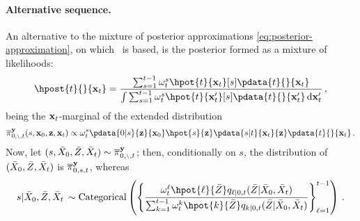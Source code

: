 \paragraph{Alternative sequence.} An alternative to the mixture of posterior approximations \eqref{eq:posterior-approximation}, on which \algo\ is based, is the posterior formed as a mixture of likelihoods: 
$$ 
    \hpost{t}{}{\bx_t} = \frac{ \sum_{s = 1}^{t-1} \wght^s _t \hpot{t}{\bx_t}[s] \pdata{t}{}{\bx_t} }{\int \sum_{s = 1}^{t-1} \wght^s _t \hpot{t}{\bx^\prime _t}[s] \pdata{t}{}{\bx^\prime _t} \, \rmd \bx^\prime _t} \eqsp, 
$$ 
being the $\mathbf{x}_t$-marginal of the extended distribution 
\begin{equation}
    \label{eq:mixture-pot-extended}
    \epost{0, \smbs, t}{}{s, \bx_0, \bz, \bx_t} \propto  \wght^s _t \pdata{0|s}{\bz}{\bx_0} \hpot{s}{\bz} \pdata{s|t}{\bx_t}{\bz} \pdata{t}{}{\bx_t} \eqsp.
\end{equation}
Now, let $(s, \bXy_0, \bZy, \bXy_t) \sim \epost{0, \smbs, t}{}{}$; then, conditionally on $s$, the distribution of $(\bar{X}_0, \bar{Z}, \bar{X}_t)$ is $\epost{0, s, t}{}{}$, whereas 
$$
s | \bXy_0, \bZy, \bXy_t \, \sim \mbox{Categorical}\left( \left\{ \frac{\wght^\ell _t \hpot{\ell}{\bZy} \fw{\ell|0, t}{\bXy_0, \bXy_t}{\bZy}}{\sum_{k = 1}^{t-1} \wght^k _t \hpot{k}{\bZy} \fw{k|0, t}{\bXy_0, \bXy_t}{\bZy}}\right\}_{\ell = 1} ^{t-1} \right) \eqsp.
$$

